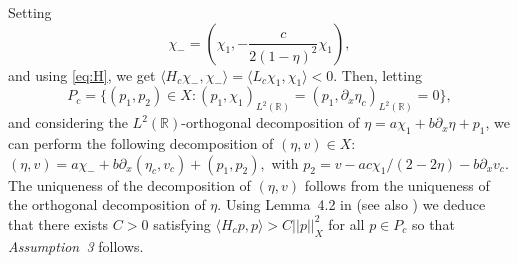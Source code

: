 \documentclass[11pt]{article}
\newcommand{\R}{\mathbb{R}}
\theoremstyle{plain}
\theoremstyle{definition}
\theoremstyle{remark}
\numberwithin{equation}{section}
\begin{document}
{	Setting \begin{equation}\label{def:chi-}
		\chi_-=\left(\chi_1,-\frac{c}{2(1-\eta)^2}\chi_1\right),
	\end{equation}
	and using \eqref{eq:H}, we get $\langle H_c\chi_-,\chi_-\rangle=\langle L_c\chi_1,\chi_1\rangle<0$. Then, letting $$P_c=\{(p_1,p_2)\in X:(p_1,\chi_1)_{ L^2(\R)}=(p_1,\partial_x\eta_c)_{ L^2(\R)}=0\},$$
	and considering the $ L^2(\R)$-orthogonal decomposition of $\eta=a\chi_1+b\partial_x\eta+p_1$,
	we can perform the following decomposition of $(\eta,v)\in X$: $(\eta,v)=a\chi_-+b\partial_x(\eta_c,v_c)+(p_1,p_2),$  %
	with $p_2=v-ac\chi_1/(2-2\eta)-b\partial_xv_c$. The uniqueness of the decomposition of $(\eta,v)$ follows from the uniqueness of the orthogonal decomposition of $\eta$. Using Lemma~4.2 in \cite{linbubbles} (see also \cite{guosemilin}) we deduce that there exists $C>0$ satisfying $\langle H_cp,p\rangle>C||p||^2_X$ for all $p\in P_c$ so that \textit{Assumption~3} follows. 
	
}
\end{document}
